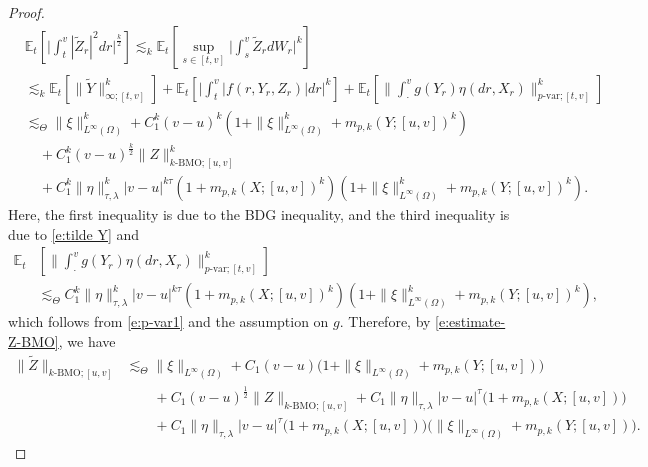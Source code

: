 \documentclass[11pt,reqno]{amsart}
\numberwithin{equation}{section}
\begin{document}
\begin{proof}
\begin{equation}
\begin{aligned}
&\mathbb{E}_{t}\left[\Big|\int_{t}^{v}|\tilde{Z}_{r}|^{2}dr\Big|^{\frac{k}{2}}\right]\lesssim_{k} \mathbb{E}_{t}\left[\sup_{s\in{[t,v]}}\Big|\int_{s}^{v}\tilde{Z}_{r}dW_{r}\Big|^{k}\right]\\
&\lesssim_{k} \mathbb{E}_{t}\left[\|\tilde{Y}\|^{k}_{\infty;[t,v]}\right] + \mathbb{E}_{t}\left[\Big|\int_{t}^{v}|f(r,Y_{r},Z_{r})|dr\Big|^{k}\right] + \mathbb{E}_{t}\left[\Big\|\int_{\cdot}^{v}g(Y_{r})\eta(dr,X_{r})\Big\|^{k}_{p\text{-var};[t,v]}\right]\\
&\lesssim_{\Theta} \|\xi\|^{k}_{L^{\infty}(\Omega)} + C_{1}^{k}(v-u)^{k}\left(1+\|\xi\|^{k}_{L^{\infty}(\Omega)}+m_{p,k}(Y;[u,v])^{k}\right) \\
&\quad + C_{1}^{k}(v-u)^{\frac{k}{2}} \|Z\|^{k}_{k\text{-BMO};[u,v]} \\
&\quad   + C_{1}^{k}\|\eta\|^{k}_{\tau,\lambda}|v-u|^{k\tau}\left(1+m_{p,k}(X;[u,v])^{k}\right)  \left(1+\|\xi\|^{k}_{L^{\infty}(\Omega)}+m_{p,k}\left(Y;[u,v]\right)^{k}\right).
\end{aligned}
\end{equation}
Here, the first inequality is due to the BDG inequality, and the third inequality is due to \eqref{e:tilde Y} and 
\begin{equation}\label{3.10}
\begin{aligned}
\mathbb{E}_{t}&\left[\Big\|\int_{\cdot}^{v}g(Y_{r})\eta(dr,X_{r})\Big\|_{p\text{-var};[t,v]}^{k}\right]\\
&\lesssim_{\Theta} C_{1}^{k}\|\eta\|^{k}_{\tau,\lambda}|v-u|^{k\tau}\left(1+m_{p,k}(X;[u,v])^{k}\right)\left(1+\|\xi\|^{k}_{L^{\infty}(\Omega)}+m_{p,k}(Y;[u,v])^{k}\right),
\end{aligned}
\end{equation}
which follows from \eqref{e:p-var1} and the assumption on $g$. Therefore, by \eqref{e:estimate-Z-BMO}, we have
\begin{equation}\label{e:estimate-theorem1-Z}
\begin{aligned}
\|\tilde{Z}\|_{k\text{-BMO};[u,v]}
&\lesssim_{\Theta} \|\xi\|_{L^{\infty}(\Omega)} + C_{1}(v-u)\big(1+\|\xi\|_{L^{\infty}(\Omega)}+m_{p,k}(Y;[u,v])\big)  \\
&\quad\quad + C_{1}(v-u)^{\frac{1}{2}}\|Z\|_{k\text{-BMO};[u,v]} + C_{1}\|\eta\|_{\tau,\lambda}|v-u|^{\tau}\big(1+m_{p,k}(X;[u,v])\big)\\
&\quad\quad + C_{1}\|\eta\|_{\tau,\lambda}|v-u|^{\tau}\big(1+m_{p,k}(X;[u,v])\big) \big(\|\xi\|_{L^{\infty}(\Omega)}+m_{p,k}(Y;[u,v])\big).
\end{aligned}
\end{equation}


\end{proof}
\end{document}
